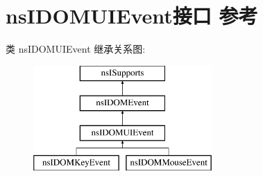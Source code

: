 \hypertarget{interfacens_i_d_o_m_u_i_event}{}\section{ns\+I\+D\+O\+M\+U\+I\+Event接口 参考}
\label{interfacens_i_d_o_m_u_i_event}
类 ns\+I\+D\+O\+M\+U\+I\+Event 继承关系图\+:\begin{figure}[H]
\begin{center}
\leavevmode
\includegraphics[height=4.000000cm]{interfacens_i_d_o_m_u_i_event}
\end{center}
\end{figure}
